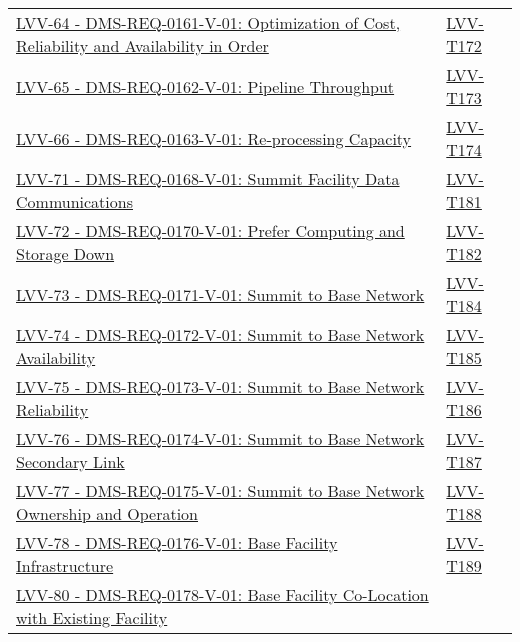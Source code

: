 \begin{longtable}[]{p{13cm}p{3cm}}
\href{https://jira.lsstcorp.org/browse/LVV-64}{LVV-64 -
DMS-REQ-0161-V-01: Optimization of Cost, Reliability and Availability in
Order} &
\protect\hyperlink{lvv-t172---verify-implementation-of-optimization-of-cost-reliability-and-availability}{LVV-T172}\tabularnewline
\href{https://jira.lsstcorp.org/browse/LVV-65}{LVV-65 -
DMS-REQ-0162-V-01: Pipeline Throughput} &
\protect\hyperlink{lvv-t173---verify-implementation-of-pipeline-throughput}{LVV-T173}\tabularnewline
\href{https://jira.lsstcorp.org/browse/LVV-66}{LVV-66 -
DMS-REQ-0163-V-01: Re-processing Capacity} &
\protect\hyperlink{lvv-t174---verify-implementation-of-re-processing-capacity}{LVV-T174}\tabularnewline
\href{https://jira.lsstcorp.org/browse/LVV-71}{LVV-71 -
DMS-REQ-0168-V-01: Summit Facility Data Communications} &
\protect\hyperlink{lvv-t181---verify-implementation-of-summit-facility-data-communications}{LVV-T181}\tabularnewline
\href{https://jira.lsstcorp.org/browse/LVV-72}{LVV-72 -
DMS-REQ-0170-V-01: Prefer Computing and Storage Down} &
\protect\hyperlink{lvv-t182---verify-implementation-of-prefer-computing-and-storage-down}{LVV-T182}\tabularnewline
\href{https://jira.lsstcorp.org/browse/LVV-73}{LVV-73 -
DMS-REQ-0171-V-01: Summit to Base Network} &
\protect\hyperlink{lvv-t184---verify-implementation-of-summit-to-base-network}{LVV-T184}\tabularnewline
\href{https://jira.lsstcorp.org/browse/LVV-74}{LVV-74 -
DMS-REQ-0172-V-01: Summit to Base Network Availability} &
\protect\hyperlink{lvv-t185---verify-implementation-of-summit-to-base-network-availability}{LVV-T185}\tabularnewline
\href{https://jira.lsstcorp.org/browse/LVV-75}{LVV-75 -
DMS-REQ-0173-V-01: Summit to Base Network Reliability} &
\protect\hyperlink{lvv-t186---verify-implementation-of-summit-to-base-network-reliability}{LVV-T186}\tabularnewline
\href{https://jira.lsstcorp.org/browse/LVV-76}{LVV-76 -
DMS-REQ-0174-V-01: Summit to Base Network Secondary Link} &
\protect\hyperlink{lvv-t187---verify-implementation-of-summit-to-base-network-secondary-link}{LVV-T187}\tabularnewline
\href{https://jira.lsstcorp.org/browse/LVV-77}{LVV-77 -
DMS-REQ-0175-V-01: Summit to Base Network Ownership and Operation} &
\protect\hyperlink{lvv-t188---verify-implementation-of-summit-to-base-network-ownership-and-operation}{LVV-T188}\tabularnewline
\href{https://jira.lsstcorp.org/browse/LVV-78}{LVV-78 -
DMS-REQ-0176-V-01: Base Facility Infrastructure} &
\protect\hyperlink{lvv-t189---verify-implementation-of-base-facility-infrastructure}{LVV-T189}\tabularnewline
\href{https://jira.lsstcorp.org/browse/LVV-80}{LVV-80 -
DMS-REQ-0178-V-01: Base Facility Co-Location with Existing Facility} &

\end{longtable}
